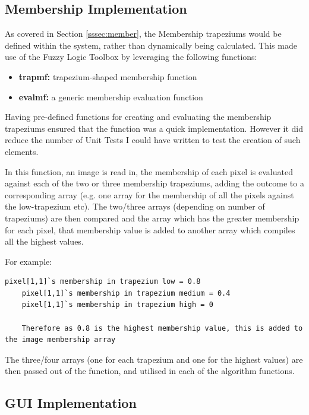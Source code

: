 \subsection{Membership Implementation}

As covered in Section \ref{sssec:member}, the Membership trapeziums would be defined within the system, rather than dynamically being calculated. This made use of the Fuzzy Logic Toolbox by leveraging the following functions:

\begin{itemize}
  \item \textbf{trapmf: } trapezium-shaped membership function
  \item \textbf{evalmf: } a generic membership evaluation function
\end{itemize}

Having pre-defined functions for creating and evaluating the membership trapeziums ensured that the function was a quick implementation. However it did reduce the number of Unit Tests I could have written to test the creation of such elements.

In this function, an image is read in, the membership of each pixel is evaluated against each of the two or three membership trapeziums, adding the outcome to a corresponding array (e.g. one array for the membership of all the pixels against the low-trapezium etc). The two/three arrays (depending on number of trapeziums) are then compared and the array which has the greater membership for each pixel, that membership value is added to another array which compiles all the highest values.

For example:

\begin{lstlisting}[style=Matlab-editor,frame=single]
    pixel[1,1]`s membership in trapezium low = 0.8
    pixel[1,1]`s membership in trapezium medium = 0.4
    pixel[1,1]`s membership in trapezium high = 0

    Therefore as 0.8 is the highest membership value, this is added to the image membership array
\end{lstlisting}

The three/four arrays (one for each trapezium and one for the highest values) are then passed out of the function, and utilised in each of the algorithm functions.

\subsection{GUI Implementation}

